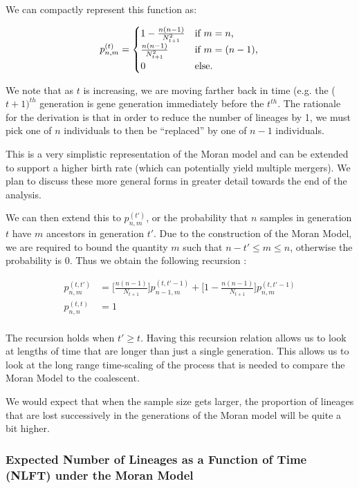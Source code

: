 \documentclass[10pt]{article}
\begin{document}
We can compactly represent this function as:

\begin{equation*}
	p^{(t)}_{n,m} = 
	\begin{cases} 1 - \frac{n(n-1)}{N^2_{t+1}}  & \text{if $m = n$,}
		\\
		\frac{n(n-1)}{N^2_{t+1}} &\text{if $ m = (n-1)$,}
		\\
		0 &\text{else.}
	\end{cases}
\end{equation*}

We note that as $t$ is increasing, we are moving farther back in time (e.g. the ($t+1)^{th}$ generation is gene generation immediately before the $t^{th}$. The rationale for the derivation is that in order to reduce the number of lineages by 1, we must pick one of $n$ individuals to then be ``replaced'' by one of $n-1$ individuals. 

This is a very simplistic representation of the Moran model and can be extended to support a higher birth rate (which can potentially yield multiple mergers). We plan to discuss these more general forms in greater detail towards the end of the analysis. 

We can then extend this to $p^{(t')}_{n,m}$, or the probability that $n$ samples in generation $t$ have $m$  ancestors in generation $t'$. Due to the construction of the Moran Model, we are required to bound the quantity $m$ such that $n-t' \leq m \leq n$, otherwise the probability is $0$. Thus we obtain the following recursion :

$$
\begin{aligned}
	p^{(t, t')}_{n,m} &= \Bigg[\frac{n(n-1)}{N_{t+1}}\Bigg] p^{(t, t'-1)}_{n-1, m} + \Bigg[1 - \frac{n(n-1)}{N_{t+1}}\Bigg] p^{(t, t'-1)}_{n,m}\\
	p^{(t, t)}_{n,n} &= 1\\
\end{aligned}
$$

The recursion holds when $t' \geq t$. Having this recursion relation allows us to look at lengths of time that are longer than just a single generation. This allows us to look at the long range time-scaling of the process that is needed to compare the Moran Model to the coalescent. 

We would expect that when the sample size gets larger, the proportion of lineages that are lost successively in the generations of the Moran model will be quite a bit higher. 

\subsubsection{Expected Number of Lineages as a Function of Time (NLFT) under the Moran Model}
\end{document}
